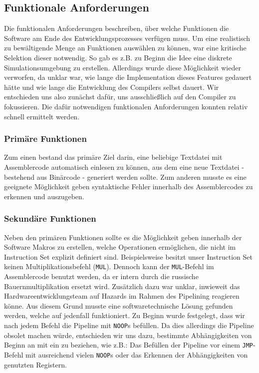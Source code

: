 \documentclass[paper=a4,fontsize=12pt,twocolumn]{scrreprt}
\begin{document}
\subsection{Funktionale Anforderungen}
\label{subsec:functionale_anforderungen}

Die funktionalen Anforderungen beschreiben, über welche Funktionen die Software am Ende des Entwicklungsprozesses verfügen muss.
Um eine realistisch zu bewältigende Menge an Funktionen auswählen zu können, war eine  kritische Selektion dieser notwendig.
So gab es z.B. zu Beginn die Idee eine diskrete Simulationsumgebung zu erstellen. Allerdings wurde diese Möglichkeit wieder verworfen, da unklar war, wie lange die Implementation dieses Features gedauert hätte und wie lange die Entwicklung des Compilers selbst dauert.
Wir entschieden uns also zunächst dafür, uns ausschließlich auf den Compiler zu fokussieren.
Die dafür notwendigen funktionalen Anforderungen konnten relativ schnell ermittelt werden.

\subsubsection{Primäre Funktionen}

Zum einen bestand das primäre Ziel darin, eine beliebige Textdatei mit Assemblercode automatisch einlesen zu können, aus dem eine neue Textdatei - bestehend aus Binärcode - generiert werden sollte.
Zum anderen musste es eine geeignete Möglichkeit geben syntaktische Fehler innerhalb des Assemblercodes zu erkennen und auszugeben.

\subsubsection{Sekundäre Funktionen}

Neben den primären Funktionen sollte es die Möglichkeit geben innerhalb der Software Makros zu erstellen, welche Operationen ermöglichen, die nicht im Instruction Set explizit definiert sind.
Beispielsweise besitzt unser Instruction Set keinen Multiplikationsbefehl (\texttt{MUL}).
Dennoch kann der \texttt{MUL}-Befehl im Assemblercode benutzt werden, da er intern durch die russische Bauernmultiplikation ersetzt wird.
Zusätzlich dazu war unklar, inwieweit das Hardwareentwicklungsteam auf Hazards im Rahmen des Pipelining reagieren könne.
Aus diesem Grund musste eine softwaretechnische Lösung  gefunden werden, welche auf jedenfall funktioniert.
Zu Beginn wurde festgelegt, dass wir nach jedem Befehl die Pipeline mit \texttt{NOOP}s befüllen.
Da dies allerdings die Pipeline obsolet machen würde, entschieden wir uns dazu, bestimmte Abhängigkeiten von Beginn an mit ein zu beziehen, wie z.B.: Das Befüllen der Pipeline vor einem \texttt{JMP}-Befehl mit ausreichend vielen \texttt{NOOP}s oder das Erkennen der Abhängigkeiten von genutzten Registern.
\end{document}
